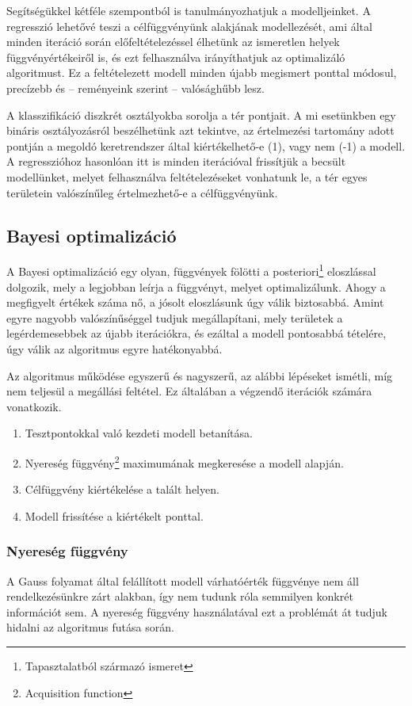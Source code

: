 Segítségükkel kétféle szempontból is tanulmányozhatjuk a modelljeinket. A regresszió lehetővé teszi a célfüggvényünk alakjának modellezését, ami által minden iteráció során előfeltételezéssel élhetünk az ismeretlen helyek függvényértékeiről is, és ezt felhasználva irányíthatjuk az optimalizáló algoritmust. Ez a feltételezett modell minden újabb megismert ponttal módosul, precízebb és -- reményeink szerint -- valósághűbb lesz.

A klasszifikáció diszkrét osztályokba sorolja a tér pontjait. A mi esetünkben egy bináris osztályozásról beszélhetünk azt tekintve, az értelmezési tartomány adott pontján a megoldó keretrendszer által kiértékelhető-e (1), vagy nem (-1) a modell. A regresszióhoz hasonlóan itt is minden iterációval frissítjük a becsült modellünket, melyet felhasználva feltételezéseket vonhatunk le, a tér egyes területein valószínűleg értelmezhető-e a célfüggvényünk.\cite{GPKonyv}


\subsection{Bayesi optimalizáció}
A Bayesi optimalizáció egy olyan, függvények fölötti a posteriori\footnote{Tapasztalatból származó ismeret} eloszlással dolgozik, mely a legjobban leírja a függvényt, melyet optimalizálunk. Ahogy a megfigyelt értékek száma nő, a jósolt eloszlásunk úgy válik biztosabbá. Amint egyre nagyobb valószínűséggel tudjuk megállapítani, mely területek a legérdemesebbek az újabb iterációkra, és ezáltal a modell pontosabbá tételére, úgy válik az algoritmus egyre hatékonyabbá.

Az algoritmus működése egyszerű és nagyszerű, az alábbi lépéseket ismétli, míg nem teljesül a megállási feltétel. Ez általában a végzendő iterációk számára vonatkozik.
\begin{enumerate}
	\item Tesztpontokkal való kezdeti modell betanítása.
	\item Nyereség függvény\footnote{Acquisition function} maximumának megkeresése a modell alapján.
	\item Célfüggvény kiértékelése a talált helyen.
	\item Modell frissítése a kiértékelt ponttal.
\end{enumerate}

\subsubsection{Nyereség függvény}
A Gauss folyamat által felállított modell várhatóérték függvénye nem áll rendelkezésünkre zárt alakban, így nem tudunk róla semmilyen konkrét információt sem. A nyereség függvény használatával ezt a problémát át tudjuk hidalni az algoritmus futása során. 

